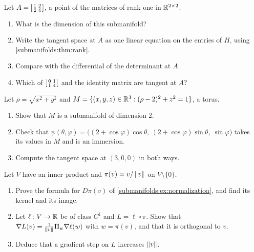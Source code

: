 \begin{notechapter}
\begin{exercise}\label{submanifolds:exr:6}
Let $A = \begin{bsmallmatrix}1 & 2\\ 2 & 4\end{bsmallmatrix}$, a point of
the matrices of rank one in $\mathbb{R}^{2\times2}$.
\begin{enumerate}[nosep]
  \item What is the dimension of this submanifold?
  \item Write the tangent space at $A$ as one linear equation on the
        entries of $H$, using \cref{submanifolds:thm:rank}.
  \item Compare with the differential of the determinant at $A$.
  \item Which of $\begin{bsmallmatrix}0 & 1\\ 1 & 4\end{bsmallmatrix}$ and
        the identity matrix are tangent at $A$?
\end{enumerate}
\end{exercise}

\begin{exercise}\label{submanifolds:exr:7}
Let $\rho = \sqrt{x^2 + y^2}$ and
$M = \{(x, y, z)\in\mathbb{R}^3 : (\rho - 2)^2 + z^2 = 1\}$, a torus.
\begin{enumerate}[nosep]
  \item Show that $M$ is a submanifold of dimension $2$.
  \item Check that
        $\psi(\theta, \varphi) = \bigl((2 + \cos\varphi)\cos\theta,\
        (2 + \cos\varphi)\sin\theta,\ \sin\varphi\bigr)$ takes its values
        in $M$ and is an immersion.
  \item Compute the tangent space at $(3, 0, 0)$ in both ways.
\end{enumerate}
\end{exercise}

\begin{exercise}\label{submanifolds:exr:8}
Let $V$ have an inner product and $\pi(v) = v/\left\|v\right\|$ on
$V\setminus\{0\}$.
\begin{enumerate}[nosep]
  \item Prove the formula for $D\pi(v)$ of
        \cref{submanifolds:ex:normalization}, and find its kernel and its
        image.
  \item Let $\ell:V\to\mathbb{R}$ be of class $C^1$ and $L = \ell\circ\pi$. Show
        that $\nabla L(v) = \frac1{\left\|v\right\|}\Pi_w\nabla\ell(w)$ with
        $w = \pi(v)$, and that it is orthogonal to $v$.
  \item Deduce that a gradient step on $L$ increases $\left\|v\right\|$.
\end{enumerate}
\end{exercise}


\end{notechapter}
